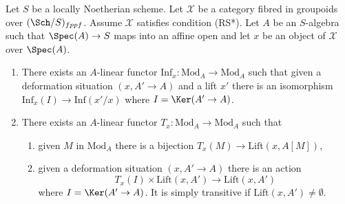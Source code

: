 \begin{lemma}
\label{lemma-properties-lift-RS-star}
Let $S$ be a locally Noetherian scheme. Let $\mathcal{X}$ be a category
fibred in groupoids over $(\Sch/S)_{fppf}$. Assume $\mathcal{X}$ satisfies
condition (RS*). Let $A$ be an $S$-algebra such that
$\Spec(A) \to S$ maps into an affine open and let $x$ be an object of
$\mathcal{X}$ over $\Spec(A)$.
\begin{enumerate}
\item There exists an $A$-linear functor
$\text{Inf}_x : \text{Mod}_A \to \text{Mod}_A$
such that given a deformation situation $(x, A' \to A)$ and a lift $x'$
there is an isomorphism $\text{Inf}_x(I) \to \text{Inf}(x'/x)$ where
$I = \Ker(A' \to A)$.
\item There exists an $A$-linear functor
$T_x : \text{Mod}_A \to \text{Mod}_A$
such that
\begin{enumerate}
\item given $M$ in $\text{Mod}_A$ there is a bijection
$T_x(M) \to \text{Lift}(x, A[M])$,
\item given a deformation situation $(x, A' \to A)$ there is an action
$$
T_x(I) \times \text{Lift}(x, A') \to \text{Lift}(x, A')
$$
where $I = \Ker(A' \to A)$. It is simply transitive if
$\text{Lift}(x, A') \not = \emptyset$.
\end{enumerate}
\end{enumerate}
\end{lemma}

